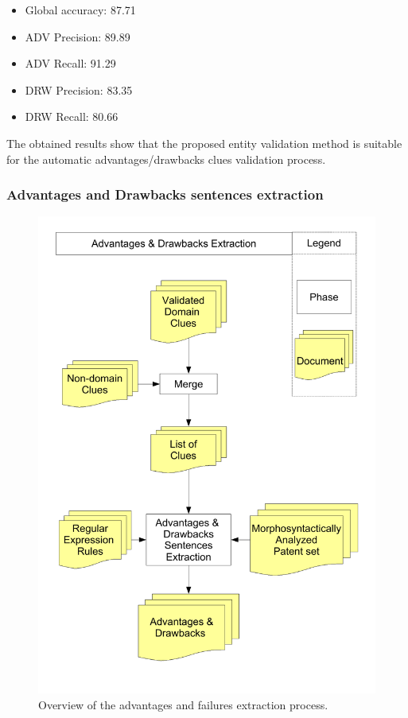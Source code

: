 \documentclass[b5paper,]{book}
\providecommand{\tightlist}{%
  \setlength{\itemsep}{0pt}\setlength{\parskip}{0pt}}
\theoremstyle{definition}
\theoremstyle{definition}
\theoremstyle{definition}
\theoremstyle{remark}
\begin{document}
\begin{itemize}
\tightlist
\item
  Global accuracy: 87.71
\item
  ADV Precision: 89.89
\item
  ADV Recall: 91.29
\item
  DRW Precision: 83.35
\item
  DRW Recall: 80.66
\end{itemize}

The obtained results show that the proposed entity validation method is
suitable for the automatic advantages/drawbacks clues validation
process.

\subsubsection*{Advantages and Drawbacks sentences
extraction}\label{advantages-and-drawbacks-sentences-extraction}

\begin{figure}

{\centering \includegraphics[width=0.8\linewidth]{_bookdown_files/figures/relevant-sentences-extraction} 

}

\caption{Overview of the advantages and failures extraction process.}\label{fig:advantagedrawbacksextraction}
\end{figure}
\end{document}
